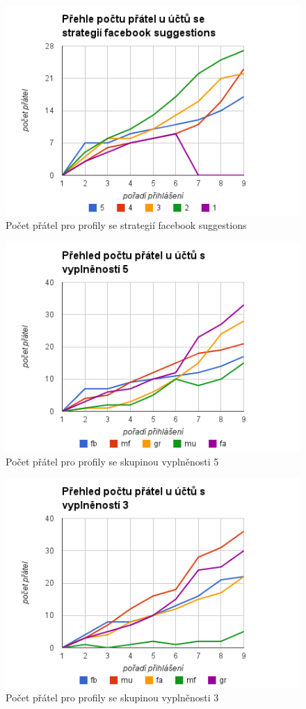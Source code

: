 \documentclass[thesis=M,czech]{FITthesis}[2013/05/10]
\begin{document}
\begin{figure}[h]
\includegraphics[width=5in]{figures/levelFb.png}
\caption{Počet přátel pro profily se strategií facebook suggestions}
\label{fig:levelFb}
\end{figure}

\begin{figure}[h]
\includegraphics[width=5in]{figures/level5.png}
\caption{Počet přátel pro profily se skupinou vyplněnosti 5}
\label{fig:level5}
\end{figure}

\begin{figure}[h]
\includegraphics[width=5in]{figures/level3.png}
\caption{Počet přátel pro profily se skupinou vyplněnosti 3}
\label{fig:level3}
\end{figure}
\end{document}
